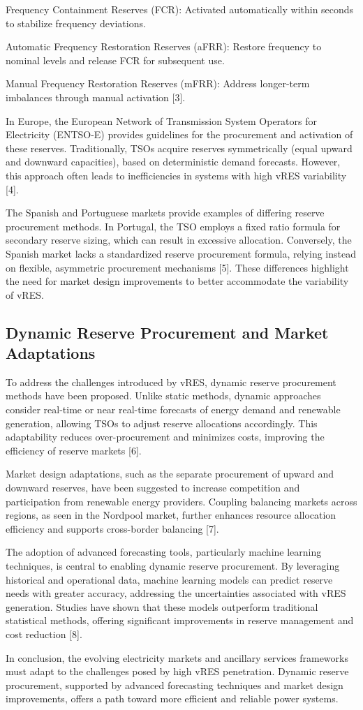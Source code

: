 Frequency Containment Reserves (FCR): Activated automatically within seconds to stabilize frequency deviations.

Automatic Frequency Restoration Reserves (aFRR): Restore frequency to nominal levels and release FCR for subsequent use.

Manual Frequency Restoration Reserves (mFRR): Address longer-term imbalances through manual activation [3].

In Europe, the European Network of Transmission System Operators for Electricity (ENTSO-E) provides guidelines for the procurement and activation of these reserves. Traditionally, TSOs acquire reserves symmetrically (equal upward and downward capacities), based on deterministic demand forecasts. However, this approach often leads to inefficiencies in systems with high vRES variability [4].

The Spanish and Portuguese markets provide examples of differing reserve procurement methods. In Portugal, the TSO employs a fixed ratio formula for secondary reserve sizing, which can result in excessive allocation. Conversely, the Spanish market lacks a standardized reserve procurement formula, relying instead on flexible, asymmetric procurement mechanisms [5]. These differences highlight the need for market design improvements to better accommodate the variability of vRES.

\subsection{Dynamic Reserve Procurement and Market Adaptations}

To address the challenges introduced by vRES, dynamic reserve procurement methods have been proposed. Unlike static methods, dynamic approaches consider real-time or near real-time forecasts of energy demand and renewable generation, allowing TSOs to adjust reserve allocations accordingly. This adaptability reduces over-procurement and minimizes costs, improving the efficiency of reserve markets [6].

Market design adaptations, such as the separate procurement of upward and downward reserves, have been suggested to increase competition and participation from renewable energy providers. Coupling balancing markets across regions, as seen in the Nordpool market, further enhances resource allocation efficiency and supports cross-border balancing [7].

The adoption of advanced forecasting tools, particularly machine learning techniques, is central to enabling dynamic reserve procurement. By leveraging historical and operational data, machine learning models can predict reserve needs with greater accuracy, addressing the uncertainties associated with vRES generation. Studies have shown that these models outperform traditional statistical methods, offering significant improvements in reserve management and cost reduction [8].

In conclusion, the evolving electricity markets and ancillary services frameworks must adapt to the challenges posed by high vRES penetration. Dynamic reserve procurement, supported by advanced forecasting techniques and market design improvements, offers a path toward more efficient and reliable power systems.

